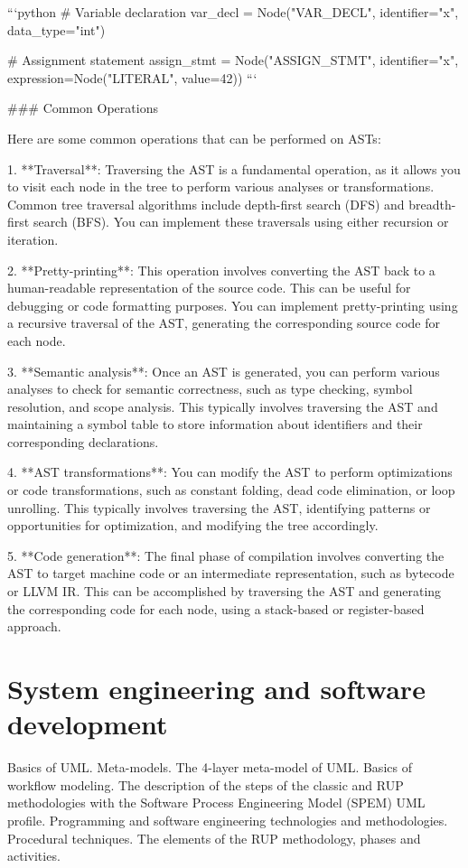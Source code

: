 \documentclass{article}
\begin{document}
```python
# Variable declaration
var_decl = Node("VAR_DECL", identifier="x", data_type="int")

# Assignment statement
assign_stmt = Node("ASSIGN_STMT", identifier="x", expression=Node("LITERAL", value=42))
```

### Common Operations

Here are some common operations that can be performed on ASTs:

1. **Traversal**: Traversing the AST is a fundamental operation, as it allows you to visit each node in the tree to perform various analyses or transformations. Common tree traversal algorithms include depth-first search (DFS) and breadth-first search (BFS). You can implement these traversals using either recursion or iteration.

2. **Pretty-printing**: This operation involves converting the AST back to a human-readable representation of the source code. This can be useful for debugging or code formatting purposes. You can implement pretty-printing using a recursive traversal of the AST, generating the corresponding source code for each node.

3. **Semantic analysis**: Once an AST is generated, you can perform various analyses to check for semantic correctness, such as type checking, symbol resolution, and scope analysis. This typically involves traversing the AST and maintaining a symbol table to store information about identifiers and their corresponding declarations.

4. **AST transformations**: You can modify the AST to perform optimizations or code transformations, such as constant folding, dead code elimination, or loop unrolling. This typically involves traversing the AST, identifying patterns or opportunities for optimization, and modifying the tree accordingly.

5. **Code generation**: The final phase of compilation involves converting the AST to target machine code or an intermediate representation, such as bytecode or LLVM IR. This can be accomplished by traversing the AST and generating the corresponding code for each node, using a stack-based or register-based approach.



\section{System engineering and software development}

Basics of UML. Meta-models. The 4-layer meta-model of UML. Basics of workflow modeling. The description of the steps of the classic and RUP methodologies with the Software Process Engineering Model (SPEM) UML profile. Programming and software engineering technologies and methodologies. Procedural techniques. The elements of the RUP methodology, phases and activities.
\end{document}
